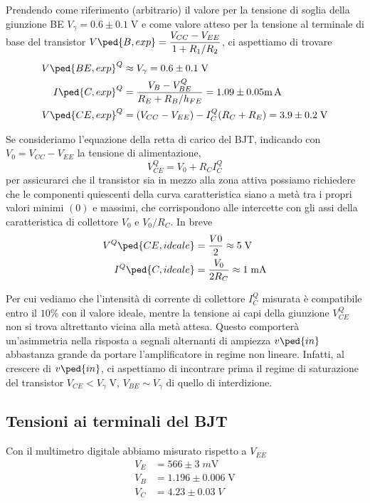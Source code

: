 \documentclass[10pt,a4paper]{article}
\begin{document}
Prendendo come riferimento (arbitrario) il valore per la tensione di soglia
della giunzione BE $V_\gamma = 0.6 \pm 0.1 \; \si{\V}$ e come valore atteso
per la tensione al terminale di base del transistor
$\ds V\ped{B, exp} = \frac{V_{CC} - V_{EE}}{1 + R_1/R_2}$, ci aspettiamo di
trovare
\begin{align*}
V\ped{BE, exp}^Q &\approx V_\gamma = 0.6 \pm 0.1 \; \si{\V} \\
I\ped{C, exp}^Q &= \frac{V_B - V_{BE}^Q}{R_E + R_B/h_{FE}} =
1.09 \pm 0.05 \si{\m\A} \\
V\ped{CE, exp}^Q &= (V_{CC} - V_{EE}) - I_C^Q(R_C + R_E) = 3.9 \pm 0.2 \;
\si{\V}
\end{align*}

Se consideriamo l'equazione della retta di carico del BJT, indicando con
$V_0 = V_{CC} - V_{EE}$ la tensione di alimentazione,
\begin{equation*}
V_{CE}^Q = V_0 + R_C I_C^Q
\end{equation*}
per assicurarci che il transistor sia in mezzo alla zona attiva possiamo
richiedere che le componenti quiescenti della curva caratteristica siano a
metà tra i propri valori minimi $(0)$ e massimi, che corrispondono alle
intercette con gli assi della caratteristica di collettore $V_0$ e $V_0/R_C$.
In breve
\begin{align*}
V^Q\ped{CE, ideale} &= \frac{V0}{2} \approx 5 \; \si{\V} \\
I^Q\ped{C, ideale} &= \frac{V_0}{2R_C} \approx 1 \; \si{\mA}
\end{align*}

Per cui vediamo che l'intensità di corrente di collettore $I_C^Q$ misurata è
compatibile entro il $10 \%$ con il valore ideale, mentre la tensione ai capi
della giunzione $V_{CE}^Q$ non si trova altrettanto vicina alla metà attesa.
Questo comporterà un'asimmetria nella risposta a segnali alternanti di
ampiezza $v\ped{in}$ abbastanza grande da portare l'amplificatore in regime
non lineare. Infatti, al crescere di $v\ped{in}$, ci aspettiamo di incontrare
prima il regime di saturazione del transistor $V_{CE} < V_\gamma \; \si{\V}$,
$V_{BE} \sim V_\gamma$ di quello di interdizione.

\subsection{Tensioni ai terminali del BJT}
Con il multimetro digitale abbiamo misurato rispetto a $V_{EE}$
\begin{align*}
V_E &= 566 \pm 3 \; \si{m\V} \\
V_B &= 1.196 \pm 0.006 \; \si{\V} \\
V_C &= 4.23 \pm 0.03 \; \si{V} \\
\end{align*}
\end{document}
